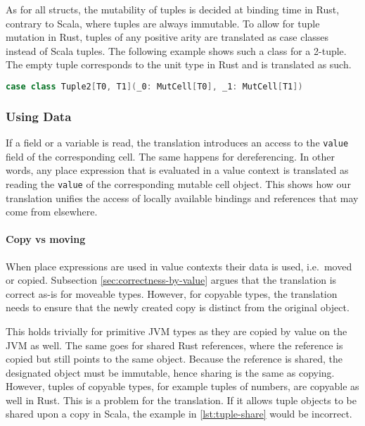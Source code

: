 As for all structs, the mutability of tuples is decided at binding time in Rust,
contrary to Scala, where tuples are always immutable. To allow for tuple
mutation in Rust, tuples of any positive arity are translated as case classes
instead of Scala tuples. The following example shows  such a class for a
2-tuple. The empty tuple corresponds to the unit type in Rust and is translated
as such.

\begin{lstlisting}[language=Scala, style=short]
case class Tuple2[T0, T1](_0: MutCell[T0], _1: MutCell[T1])
\end{lstlisting}

\subsubsection{Using Data}

If a field or a variable is read, the translation introduces an access to the
\passthrough{\lstinline!value!} field of the corresponding cell. The same
happens for dereferencing. In other words, any place expression that is
evaluated in a value context is translated as reading the
\passthrough{\lstinline!value!} of the corresponding mutable cell object. This
shows how our translation unifies the access of locally available bindings and
references that may come from elsewhere.

\paragraph{Copy vs moving}

When place expressions are used in value contexts their data is used, i.e.~moved
or copied. Subsection \ref{sec:correctness-by-value} argues that the translation
is correct as-is for moveable types. However, for copyable types, the
translation needs to ensure that the newly created copy is distinct from the
original object.

This holds trivially for primitive JVM types as they are copied by value on the
JVM as well. The same goes for shared Rust references, where the reference is
copied but still points to the same object. Because the reference is shared, the
designated object must be immutable, hence sharing is the same as copying.
However, tuples of copyable types, for example tuples of numbers, are copyable
as well in Rust. This is a problem for the translation. If it allows tuple
objects to be shared upon a copy in Scala, the example in
\autoref{lst:tuple-share} would be incorrect.

